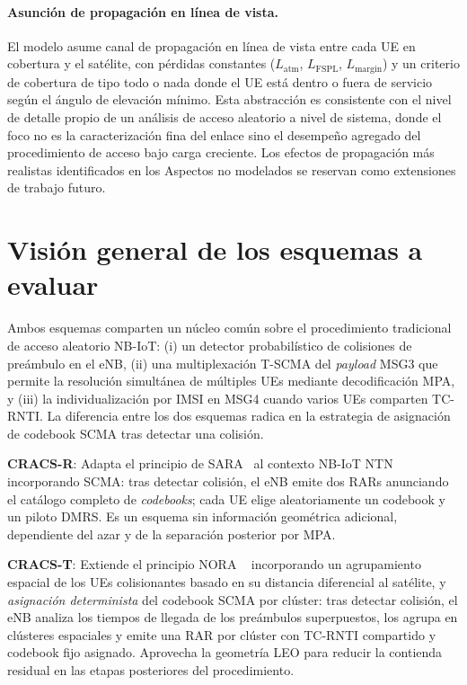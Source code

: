\paragraph{Asunción de propagación en línea de vista.} El modelo asume canal de propagación en línea de vista entre cada UE en cobertura y el satélite, con pérdidas constantes ($L_{\text{atm}}$, $L_{\text{FSPL}}$, $L_{\text{margin}}$) y un criterio de cobertura de tipo todo o nada donde el UE está dentro o fuera de servicio según el ángulo de elevación mínimo. Esta abstracción es consistente con el nivel de detalle propio de un análisis de acceso aleatorio a nivel de sistema, donde el foco no es la caracterización fina del enlace sino el desempeño agregado del procedimiento de acceso bajo carga creciente. Los efectos de propagación más realistas identificados en los Aspectos no modelados se reservan como extensiones de trabajo futuro.

\section{Visión general de los esquemas a evaluar}
\label{sec:vision}

 Ambos esquemas comparten un núcleo común sobre el procedimiento tradicional de acceso aleatorio NB-IoT: (i) un detector probabilístico de colisiones de preámbulo en el eNB, (ii) una multiplexación T-SCMA del \textit{payload} MSG3 que permite la resolución simultánea de múltiples UEs mediante decodificación MPA, y (iii) la individualización por IMSI en MSG4 cuando varios UEs comparten TC-RNTI. La diferencia entre los dos esquemas radica en la estrategia de asignación de codebook SCMA tras detectar una colisión.

\textbf{CRACS-R}: Adapta el principio de SARA~\cite{ref9} al contexto NB-IoT NTN incorporando SCMA: tras detectar colisión, el eNB emite dos RARs anunciando el catálogo completo de \textit{codebooks}; cada UE elige aleatoriamente un codebook y un piloto DMRS. Es un esquema sin información geométrica adicional, dependiente del azar y de la separación posterior por MPA.

\textbf{CRACS-T}: Extiende el principio NORA ~\cite{ref4} incorporando un agrupamiento espacial de los UEs colisionantes basado en su distancia diferencial al satélite, y \emph{asignación determinista} del codebook SCMA por clúster: tras detectar colisión, el eNB analiza los tiempos de llegada de los preámbulos superpuestos, los agrupa en clústeres espaciales y emite una RAR por clúster con TC-RNTI compartido y codebook fijo asignado. Aprovecha la geometría LEO para reducir la contienda residual en las etapas posteriores del procedimiento.

